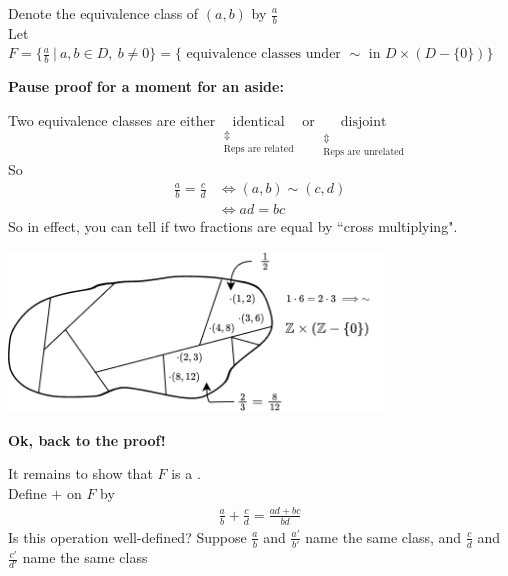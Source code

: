 \begin{theorem}
    \noindent Denote the equivalence class of $(a,b)$ by $\frac{a}{b}$ \steezybreak \\
    Let $F=\{\frac{a}{b} \ | \ a,b\in D, \  b\neq 0\} = \{\text{ equivalence classes under }\sim \text{ in }D\times (D-\{0\})\}$
    \begin{tcolorbox}
        \begin{center}
            \textbf{Pause proof for a moment for an aside:}
        \end{center}
        Two equivalence classes are either $\underset{\substack{\Updownarrow \\ \text{Reps are related}}}{\text{identical}}$ or $\underset{\substack{\Updownarrow \\ \text{Reps are unrelated} }}{\text{disjoint}}$\\
        So 
        \begin{align}
            \frac{a}{b}=\frac{c}{d} &\iff (a,b)\sim (c,d) \nonumber \\
            &\iff ad = bc \nonumber
        \end{align}
        So in effect, you can tell if two fractions are equal by ``cross multiplying".
        \begin{center}
            \includegraphics[width=0.75\textwidth]{Figures/quotient_equiv_classes.png}
        \end{center}
        \begin{center}
            \textbf{Ok, back to the proof!}
        \end{center}
    \end{tcolorbox}
    \noindent It remains to show that $F$ is a . \\ 
    Define $+$ on $F$ by
    \begin{align}
        \frac{a}{b}+\frac{c}{d} = \frac{ad+bc}{bd} \nonumber
    \end{align}
    Is this operation well-defined? Suppose $\frac{a}{b}$ and $\frac{a'}{b'}$ name the same class, and $\frac{c}{d}$ and $\frac{c'}{d'}$ name the same class
    \begin{align}

\end{align}
\end{theorem}
